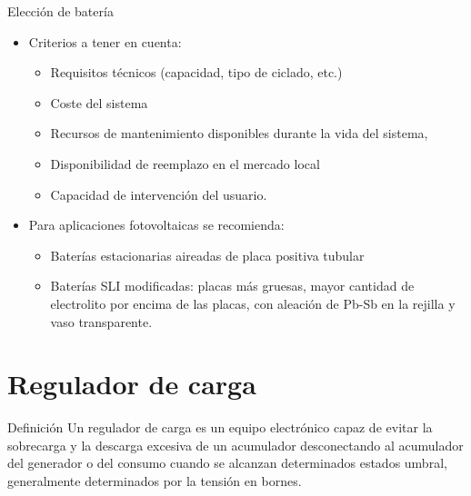 \documentclass[xcolor={usenames,svgnames,dvipsnames}]{beamer}
\begin{document}
\begin{frame}[label={sec:orgbe353c4}]{Elección de batería}
\begin{itemize}
\item Criterios a tener en cuenta:

\begin{itemize}
\item \alert{Requisitos técnicos} (capacidad, tipo de ciclado, etc.)

\item \alert{Coste del sistema}

\item Recursos de \alert{mantenimiento} disponibles durante la vida del sistema,

\item \alert{Disponibilidad de reemplazo} en el mercado local

\item Capacidad de intervención del usuario.
\end{itemize}

\item \alert{Para aplicaciones fotovoltaicas} se recomienda:

\begin{itemize}
\item \alert{Baterías estacionarias aireadas de placa positiva tubular}

\item \alert{Baterías SLI modificadas}: placas más gruesas, mayor cantidad de
electrolito por encima de las placas, con aleación de Pb-Sb en la
rejilla y vaso transparente.
\end{itemize}
\end{itemize}
\end{frame}

\section{Regulador de carga}
\label{sec:org707f434}

\begin{frame}[label={sec:orga054f04}]{Definición}
Un regulador de carga es un equipo electrónico capaz de \alert{evitar la sobrecarga y la descarga excesiva de un acumulador} desconectando al acumulador del generador o del consumo \alert{cuando se alcanzan determinados estados umbral, generalmente determinados por la tensión en bornes}.
\end{frame}
\end{document}
